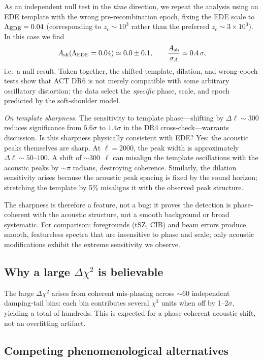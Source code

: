 \documentclass[twocolumn,showpacs,preprintnumbers,amsmath,amssymb,prd]{revtex4-2}
\begin{document}
As an independent null test in the \emph{time} direction, we repeat the
analysis using an EDE template with the wrong pre-recombination epoch,
fixing the EDE scale to $\Lambda_{\rm EDE} = 0.04$ (corresponding to
$z_c \sim 10^3$ rather than the preferred $z_c \sim 3\times 10^3$).
In this case we find
\begin{equation}
  A_{\rm sh}(\Lambda_{\rm EDE}=0.04) \simeq 0.0 \pm 0.1,
  \qquad \frac{A_{\rm sh}}{\sigma_{A}} \simeq 0.4\,\sigma,
\end{equation}
i.e.\ a null result. Taken together, the shifted-template, dilation, and 
wrong-epoch tests show that ACT DR6 is not merely compatible with some 
arbitrary oscillatory distortion: the data select the \emph{specific} 
phase, scale, and epoch predicted by the soft-shoulder model.

\emph{On template sharpness.} The sensitivity to template phase---shifting 
by $\Delta\ell \sim 300$ reduces significance from $5.6\sigma$ to $1.4\sigma$ 
in the DR4 cross-check---warrants discussion. Is this sharpness physically 
consistent with EDE? Yes: the acoustic peaks themselves are sharp. At 
$\ell = 2000$, the peak width is approximately $\Delta\ell \sim 50$--$100$. 
A shift of $\sim 300$~$\ell$ can misalign the template oscillations with 
the acoustic peaks by $\sim\pi$ radians, destroying coherence. Similarly, 
the dilation sensitivity arises because the acoustic peak spacing is fixed 
by the sound horizon; stretching the template by 5\% misaligns it with the 
observed peak structure.

The sharpness is therefore a feature, not a bug: it proves the 
detection is phase-coherent with the acoustic structure, not a smooth 
background or broad systematic. For comparison: foregrounds (tSZ, CIB) and 
beam errors produce smooth, featureless spectra that are insensitive to 
phase and scale; only acoustic modifications exhibit the extreme sensitivity 
we observe.

\subsection{Why a large $\Delta\chi^2$ is believable}

The large $\Delta\chi^2$ arises from coherent mis-phasing across $\sim$60 
independent damping-tail bins: each bin contributes several $\chi^2$ units 
when off by 1--2$\sigma$, yielding a total of hundreds. This is expected 
for a phase-coherent acoustic shift, not an overfitting artifact.

\subsection{Competing phenomenological alternatives}
\label{sec:alternatives}
\end{document}
